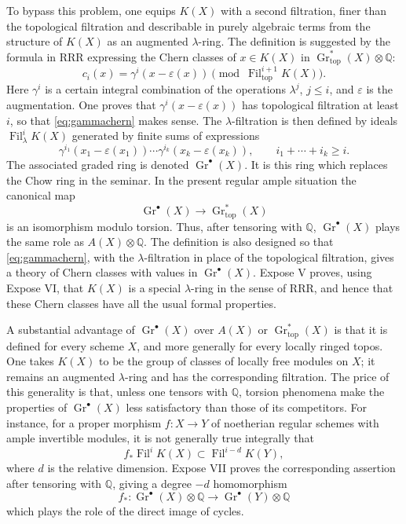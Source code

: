 \documentclass[11pt]{article}
\theoremstyle{plain}
\theoremstyle{definition}
\theoremstyle{remark}
\newcommand{\QQ}{\mathbb Q}
\DeclareMathOperator{\Gr}{Gr}
\providecommand{\Fil}{\operatorname{Fil}}
\providecommand{\eps}{\varepsilon}
\begin{document}
To bypass this problem, one equips $K(X)$ with a second filtration, finer than the topological filtration and describable in purely algebraic terms from the structure of $K(X)$ as an augmented $\lambda$-ring. The definition is suggested by the formula in RRR expressing the Chern classes of $x\in K(X)$ in $\Gr^*_{\mathrm{top}}(X)\otimes\QQ$:
\begin{equation}\label{eq:gammachern}
   c_i(x)=\gamma^i(x-\eps(x))\pmod{\Fil^{i+1}_{\mathrm{top}}K(X)}.
\end{equation}
Here $\gamma^i$ is a certain integral combination of the operations $\lambda^j$, $j\leq i$, and $\eps$ is the augmentation. One proves that $\gamma^i(x-\eps(x))$ has topological filtration at least $i$, so that \eqref{eq:gammachern} makes sense. The $\lambda$-filtration is then defined by ideals $\Fil^i_{\lambda}K(X)$ generated by finite sums of expressions
\[
   \gamma^{i_1}(x_1-\eps(x_1))\cdots
   \gamma^{i_k}(x_k-\eps(x_k)),\qquad i_1+\cdots+i_k\geq i.
\]
The associated graded ring is denoted $\Gr^{\bullet}(X)$. It is this ring which replaces the Chow ring in the seminar. In the present regular ample situation the canonical map
\[
   \Gr^{\bullet}(X)\to\Gr^*_{\mathrm{top}}(X)
\]
is an isomorphism modulo torsion. Thus, after tensoring with $\QQ$, $\Gr^{\bullet}(X)$ plays the same role as $A(X)\otimes\QQ$. The definition is also designed so that \eqref{eq:gammachern}, with the $\lambda$-filtration in place of the topological filtration, gives a theory of Chern classes with values in $\Gr^{\bullet}(X)$. Expose V proves, using Expose VI, that $K(X)$ is a special $\lambda$-ring in the sense of RRR, and hence that these Chern classes have all the usual formal properties.

A substantial advantage of $\Gr^{\bullet}(X)$ over $A(X)$ or $\Gr^*_{\mathrm{top}}(X)$ is that it is defined for every scheme $X$, and more generally for every locally ringed topos. One takes $K(X)$ to be the group of classes of locally free modules on $X$; it remains an augmented $\lambda$-ring and has the corresponding filtration. The price of this generality is that, unless one tensors with $\QQ$, torsion phenomena make the properties of $\Gr^{\bullet}(X)$ less satisfactory than those of its competitors. For instance, for a proper morphism $f:X\to Y$ of noetherian regular schemes with ample invertible modules, it is not generally true integrally that
\[
   f_*\Fil^iK(X)\subset \Fil^{i-d}K(Y),
\]
where $d$ is the relative dimension. Expose VII proves the corresponding assertion after tensoring with $\QQ$, giving a degree $-d$ homomorphism
\[
   f_*:\Gr^{\bullet}(X)\otimes\QQ\to \Gr^{\bullet}(Y)\otimes\QQ
\]
which plays the role of the direct image of cycles.
\end{document}
